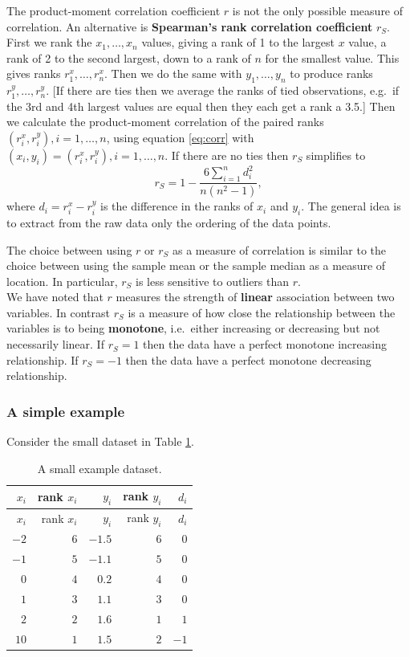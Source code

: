 \documentclass[
  british,
  11pt,
  openany, a4paper]{book}
\begin{document}
The product-moment correlation coefficient \(r\) is not the only possible measure of correlation. An alternative is \textbf{Spearman's rank correlation coefficient} \(r_S\). First we rank the \(x_1,\ldots,x_n\) values, giving a rank of 1 to the largest \(x\) value, a rank of 2 to the second largest, down to a rank of \(n\) for the smallest value. This gives ranks \(r^x_1, \ldots, r^x_n\). Then we do the same with \(y_1,\ldots,y_n\) to produce ranks \(r^y_1, \ldots, r^y_n\). {[}If there are ties then we average the ranks of tied observations, e.g.~if the 3rd and 4th largest values are equal then they each get a rank a 3.5.{]} Then we calculate the product-moment correlation of the paired ranks \((r^x_i, r^y_i), i=1,\ldots,n\), using equation \eqref{eq:corr} with \((x_i, y_i) = (r^x_i, r^y_i), i=1,\ldots,n\). If there are no ties then \(r_S\) simplifies to
\[r_S = 1- \frac{6\displaystyle\sum_{i=1}^n d_i^2}{n(n^2-1)}, \]
where \(d_i=r^x_i-r^y_i\) is the difference in the ranks of \(x_i\) and \(y_i\). The general idea is to extract from the raw data only the ordering of the data points.

The choice between using \(r\) or \(r_S\) as a measure of correlation is similar to the choice between using the sample mean or the sample median as a measure of location. In particular, \(r_S\) is less sensitive to outliers than \(r\).\\
We have noted that \(r\) measures the strength of \textbf{linear} association between two variables. In contrast \(r_S\) is a measure of how close the relationship between the variables is to being \textbf{monotone}, i.e.~either increasing or decreasing but not necessarily linear. If \(r_S=1\) then the data have a perfect monotone increasing relationship. If \(r_S=-1\) then the data have a perfect monotone decreasing relationship.

\subsubsection*{A simple example}\label{a-simple-example}

Consider the small dataset in Table \ref{tab:smalldata}.

\begin{longtable}[]{@{}rrrrr@{}}
\caption{\label{tab:smalldata} A small example dataset.}\tabularnewline
\toprule\noalign{}
\(x_i\) & rank \(x_i\) & \(y_i\) & rank \(y_i\) & \(d_i\) \\
\midrule\noalign{}
\endfirsthead
\toprule\noalign{}
\(x_i\) & rank \(x_i\) & \(y_i\) & rank \(y_i\) & \(d_i\) \\
\midrule\noalign{}
\endhead
\bottomrule\noalign{}
\endlastfoot
\(-2\) & \(6\) & \(-1.5\) & \(6\) & \(0\) \\
\(-1\) & \(5\) & \(-1.1\) & \(5\) & \(0\) \\
\(0\) & \(4\) & \(0.2\) & \(4\) & \(0\) \\
\(1\) & \(3\) & \(1.1\) & \(3\) & \(0\) \\
\(2\) & \(2\) & \(1.6\) & \(1\) & \(1\) \\
\(10\) & \(1\) & \(1.5\) & \(2\) & \(-1\) \\
\end{longtable}
\end{document}
